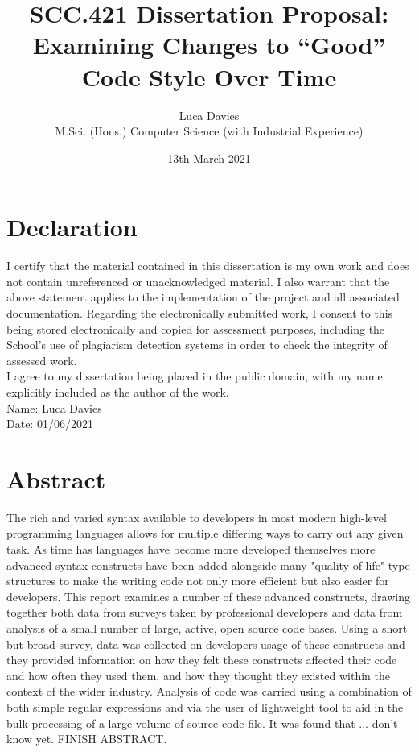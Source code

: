 \documentclass{article}
\title{\textbf{SCC.421 Dissertation Proposal: \\ Examining Changes to ``Good'' Code Style Over Time}}
\author{
Luca Davies \\ M.Sci. (Hons.) Computer Science (with Industrial Experience)}
\date{13th March 2021}
\begin{document}
\maketitle

\newpage
\section*{Declaration}
    I certify that the material contained in this dissertation is my own work and does not contain unreferenced or unacknowledged material. I also warrant that the above statement applies to the implementation of the project and all associated documentation. Regarding the electronically submitted work, I consent to this being stored electronically and copied for assessment purposes, including the School’s use of plagiarism detection systems in order to check the integrity of assessed work. \\
    I agree to my dissertation being placed in the public domain, with my name explicitly included as the author of the work. \\
    
    \noindent
    Name: Luca Davies\\
    Date: 01/06/2021
\newpage
\section*{Abstract}
    The rich and varied syntax available to developers in most modern high-level programming languages allows for multiple differing ways to carry out any given task. As time has languages have become more developed themselves more advanced syntax constructs have been added alongside many "quality of life" type structures to make the writing code not only more efficient but also easier for developers. This report examines a number of these advanced constructs, drawing together both data from surveys taken by professional developers and data from analysis of a small number of large, active, open source code bases. Using a short but broad survey, data was collected on developers usage of these constructs and they provided information on how they felt these constructs affected their code and how often they used them, and how they thought they existed within the context of the wider industry. Analysis of code was carried using a combination of both simple regular expressions and via the user of lightweight tool to aid in the bulk processing of a large volume of source code file. It was found that ... don't know yet. FINISH ABSTRACT.
    \newline
\newpage
\tableofcontents
\newpage
\end{document}
